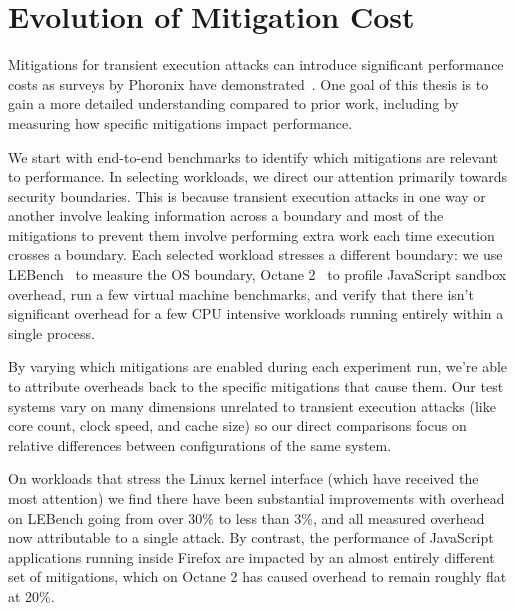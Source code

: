 \section{Evolution of Mitigation Cost}
Mitigations for transient execution attacks can introduce significant performance costs as surveys by Phoronix have demonstrated~\cite{phoronix:perf-zombieload, phoronix:two-years, phoronix:three-years}.
One goal of this thesis is to gain a more detailed understanding compared to prior work, including by measuring how specific mitigations impact performance.

We start with end-to-end benchmarks to identify which mitigations are relevant to performance.
In selecting workloads, we direct our attention primarily towards security boundaries.
This is because transient execution attacks in one way or another involve leaking information across a boundary and most of the mitigations to prevent them involve performing extra work each time execution crosses a boundary. 
Each selected workload stresses a different boundary: we use LEBench~\cite{ren:lebench} to measure the OS boundary, Octane 2~\cite{google:octane2} to profile JavaScript sandbox overhead, run a few virtual machine benchmarks, and verify that there isn't significant overhead for a few CPU intensive workloads running entirely within a single process.

By varying which mitigations are enabled during each experiment run, we're able to attribute overheads back to the specific mitigations that cause them.
Our test systems vary on many dimensions unrelated to transient execution attacks (like core count, clock speed, and cache size) so our direct comparisons focus on relative differences between configurations of the same system.

On workloads that stress the Linux kernel interface (which have received the most attention) we find there have been substantial improvements with overhead on LEBench going from over 30\% to less than 3\%, and all measured overhead now attributable to a single attack.
By contrast, the performance of JavaScript applications running inside Firefox are impacted by an almost entirely different set of mitigations, which on Octane 2 has caused overhead to remain roughly flat at 20\%.


